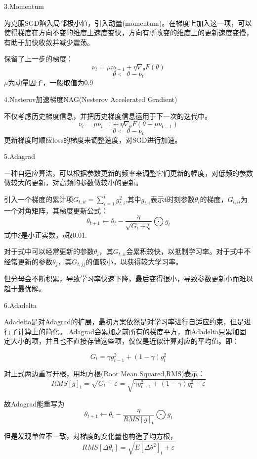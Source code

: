 \documentclass[openbib]{article}
\begin{document}
\begin{center}
3.Momentum
\end{center}
为克服SGD陷入局部极小值，引入动量(momentum)。在梯度上加入这一项，可以使得梯度在方向不变的维度上速度变快，方向有所改变的维度上的更新速度变慢，有助于加快收敛并减少震荡。

保留了上一步的梯度：
$$\nu_t=\mu\nu_{t-1}+\eta\nabla _\theta F(\theta)$$
$$\theta \Leftarrow \theta - \nu_t$$
$\mu$为动量因子，一般取值为0.9

\begin{center}
	4.Nesterov加速梯度NAG(Nesterov Accelerated Gradient)
\end{center}
不仅考虑历史梯度信息，并把历史梯度信息运用于下一次的迭代中。
$$\nu_t=\mu\nu_{t-1}+\eta\nabla _\theta F(\theta-\mu\nu_{t-1})$$
$$\theta \Leftarrow \theta - \nu_t$$
更新梯度时顺应loss的梯度来调整速度，对SGD进行加速。

\begin{center}
	5.Adagrad
\end{center}
一种自适应算法，可以根据参数更新的频率来调整它们更新的幅度，对低频的参数做较大的更新，对高频的参数做较小的更新。

引入一个梯度的累计项$G_{t,ii}=\sum_{i=1}^{t}g_{t,i}^2$,其中$g_{t,i}$表示t时刻参数$\theta_i$的梯度，$G_{t,ii}$为一个对角矩阵，其梯度更新公式：
$$\theta_{t+1}\leftarrow \theta_t- \frac{\eta}{\sqrt{G_t+\xi}}\bigodot g_t$$
式中$\xi$是小正实数，$\eta$取0.01.

对于式中可以经常更新的参数$\theta_i$，其$G_{t,ii}$会累积较快，以抵制学习率。对于式中不经常更新的参数$\theta_j$，其$G_{t,jj}$的值较小，以获得较大学习率。

但分母会不断积累，导致学习率快速下降，最后变得很小，导致参数更新小而难以趋于最优解。
\begin{center}
	6.Adadelta
\end{center}
Adadelta是对Adagrad的扩展，最初方案依然是对学习率进行自适应约束，但是进行了计算上的简化。 Adagrad会累加之前所有的梯度平方，而Adadelta只累加固定大小的项，并且也不直接存储这些项，仅仅是近似计算对应的平均值。即：

$$G_t=\gamma g_{t-1}^2+(1-\gamma)g_t^2$$

对上式两边重写开根，用均方根(Root Mean Squared,RMS)表示：
$$RMS[g]_t=\sqrt{G_t+\varepsilon}=\sqrt{\gamma g_{t-1}^2+(1-\gamma)g_t^2+\varepsilon}$$

故Adagrad能重写为
$$\theta_{t+1}\leftarrow \theta_t- \frac{\eta}{RMS[g]_t}\bigodot g_t$$

但是发现单位不一致，对梯度的变化量也构造了均方根，
$$RMS[\Delta \theta_i]=\sqrt{E[\Delta \theta ^2]_t+\varepsilon}$$
\end{document}
